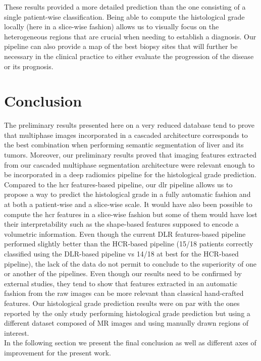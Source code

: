 These results provided a more detailed prediction than the one
consisting of a single patient-wise classification. Being able to
compute the histological grade locally (here in a slice-wise fashion)
allows us to visually focus on the heterogeneous regions that are
crucial when needing to establish a diagnosis. Our pipeline can also
provide a map of the best biopsy sites that will further be necessary in
the clinical practice to either evaluate the progression of the disease
or its prognosis.\\


\section{Conclusion}


The preliminary results presented here on a very reduced database tend to prove that multiphase images incorporated in a cascaded architecture corresponds to the best combination when performing semantic segmentation of liver and its tumors. Moreover, our preliminary results proved that imaging features extracted from our cascaded multiphase segmentation architecture were relevant enough to be incorporated in a deep radiomics pipeline for the histological grade prediction. 
Compared to the \ac{hcr} features-based pipeline, our \ac{dlr} pipeline allows us to propose a way to predict the histological grade in a fully automatic fashion and at both a patient-wise and a slice-wise scale. 
It would have also been possible to compute the \ac{hcr} features in a slice-wise fashion but some of them would have lost their interpretability such as the shape-based features supposed to encode a volumetric information. Even though the current DLR features-based pipeline performed slightly better than the HCR-based pipeline (15/18 patients correctly classified using the DLR-based pipeline vs 14/18 at best for the HCR-based pipeline), the lack of the data do not permit to conclude to the superiority of one or another of the pipelines.
Even though our results need to be confirmed by external studies, they tend to show that features extracted in an automatic fashion from the raw images can be more relevant than classical hand-crafted features.
Our histological grade prediction results were on par with the ones reported by the only study performing histological grade prediction but using a different dataset composed of MR images and using manually drawn regions of interest.\\
In the following section we present the final conclusion as well as different axes of improvement for the present work.

